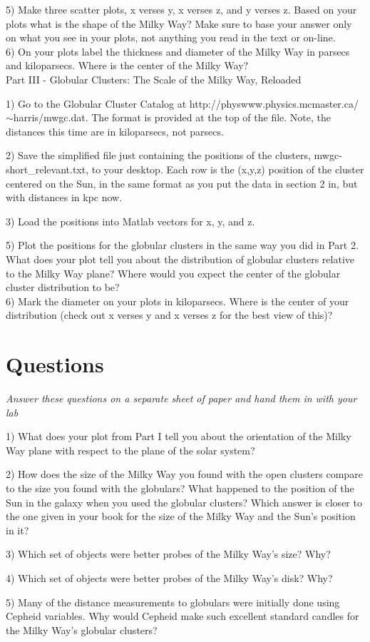 \documentclass[11pt]{article}
\begin{document}
5) Make three scatter plots, x verses y, x verses z, and y verses z.
Based on your plots what is the shape of the Milky Way?  Make sure to
base your answer only on what you see in your plots, not anything you
read in the text or on-line.\\  

6) On your plots label the thickness and diameter of the Milky Way in
parsecs and kiloparsecs.  Where is the center of the Milky Way?\\

Part III - Globular Clusters: The Scale of the Milky Way, Reloaded

1) Go to the Globular Cluster Catalog at
http://physwww.physics.mcmaster.ca/$\sim$harris/mwgc.dat.  The format is provided
at the top of the file.  Note, the distances this time are in
kiloparsecs, not parsecs.

2) Save the simplified file just containing the positions of the clusters, mwgc-short\_relevant.txt, to your desktop. Each row is the (x,y,z) position of the cluster centered on the Sun, in the same format as you put the data in section 2 in, but with distances in kpc now.

3) Load the positions into Matlab vectors for x, y, and z.

5) Plot the positions for the globular
clusters in the same way you did in Part 2.  What does your plot tell you about the distribution of globular clusters relative to the Milky Way plane?  Where would you
expect the center of the globular cluster distribution to be?\\

6) Mark the diameter on your plots in kiloparsecs.  Where is the center
of your distribution (check out x verses y and x verses z for the best
view of this)?\\

\section{{\bf Questions}}

{\it Answer these questions on a separate sheet of paper and hand them
  in with your lab}

1) What does your plot from Part I tell you about the orientation of
the Milky Way plane with respect to the plane of the solar system? 

2) How does the size of the Milky Way you found with the open clusters
compare to the size you found with the globulars?  What happened to
the position of the Sun in the galaxy when you used the globular
clusters?  Which answer is closer to the one given in your book for
the size of the Milky Way and the Sun's position in it?

3) Which set of objects were better probes of the Milky Way's size?  Why?

4) Which set of objects were better probes of the Milky Way's disk?  Why?   

5) Many of the distance measurements to globulars were initially done
using Cepheid variables.  Why would Cepheid make such excellent
standard candles for the Milky Way's globular clusters?
\end{document}

